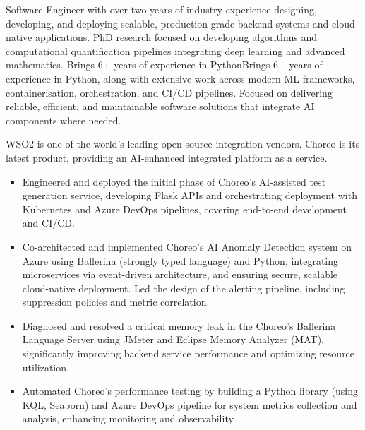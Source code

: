\documentclass[12pt,a4paper,withhyper]{altacv}
\begin{document}


\makecvheader{}

\medskip


Software Engineer with over two years of industry experience designing, developing, and deploying scalable, production-grade backend systems and cloud-native applications. PhD research focused on developing algorithms and computational quantification pipelines integrating deep learning and advanced mathematics. Brings 6+ years of experience in PythonBrings 6+ years of experience in Python, along with extensive work across modern ML frameworks, containerisation, orchestration, and CI/CD pipelines. Focused on delivering reliable, efficient, and maintainable software solutions that integrate AI components where needed.

\medskip


WSO2 is one of the world's leading open-source integration vendors. Choreo is its latest product, providing an AI-enhanced integrated platform as a service.
\medskip

\begin{itemize}
\item Engineered and deployed the initial phase of Choreo's AI-assisted test generation service, developing Flask APIs and orchestrating deployment with Kubernetes and Azure DevOps pipelines, covering end-to-end development and CI/CD.
\item Co-architected and implemented Choreo’s AI Anomaly Detection system on Azure using Ballerina (strongly typed language) and Python, integrating microservices via event-driven architecture, and ensuring secure, scalable cloud-native deployment. Led the design of the alerting pipeline, including suppression policies and metric correlation.
\item Diagnosed and resolved a critical memory leak in the Choreo's Ballerina Language Server using JMeter and Eclipse Memory Analyzer (MAT), significantly improving backend service performance and optimizing resource utilization.
\item Automated Choreo’s performance testing by building a Python library (using KQL, Seaborn) and Azure DevOps pipeline for system metrics collection and analysis, enhancing monitoring and observability
\end{itemize}
\end{document}
